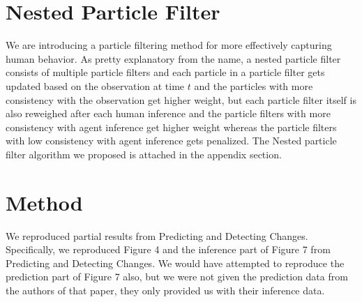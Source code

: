\documentclass[12pt,letterpaper]{article}
\begin{document}
\section{Nested Particle Filter}
We are introducing a particle filtering method for more effectively capturing human behavior. As pretty explanatory from the name, a nested particle filter consists of multiple particle filters and each particle in a particle filter gets updated based on the observation at time $t$ and the particles with more consistency with the observation get higher weight, but each particle filter itself is also reweighed after each human inference and the particle filters with more consistency with agent inference get higher weight whereas the particle filters with low consistency with agent inference gets penalized. The Nested particle filter algorithm we proposed is attached in the appendix section. 
\section{Method}

We reproduced partial results from Predicting and Detecting Changes. Specifically, we reproduced Figure 4 and the inference part of Figure 7 from Predicting and Detecting Changes. We would have attempted to reproduce the prediction part of Figure 7 also, but we were not given the prediction data from the authors of that paper, they only provided us with their inference data.
\end{document}
